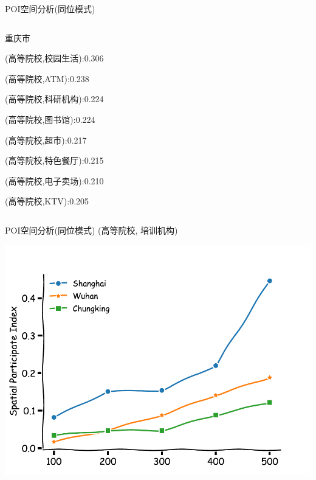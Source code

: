 \begin{frame}[c]{POI空间分析(同位模式)}
\begin{columns}
        \begin{column}{0.333 \textwidth}
        \alert{重庆市}

        \vspace{1em}
        (高等院校,校园生活):0.306
        \vspace{1em}

        (高等院校,ATM):0.238
        \vspace{1em}

        (高等院校,科研机构):0.224
        \vspace{1em}

        (高等院校,图书馆):0.224
        \vspace{1em}

        (高等院校,超市):0.217
        \vspace{1em}

        (高等院校,特色餐厅):0.215
        \vspace{1em}

        (高等院校,电子卖场):0.210
        \vspace{1em}

        (高等院校,KTV):0.205
        \end{column}
        
    \end{columns}
\end{frame}

\begin{frame}[c]{POI空间分析(同位模式)}
    \alert{(高等院校, 培训机构)}

    \includegraphics[scale=0.6]{figures/Participate.pdf}
\end{frame}


